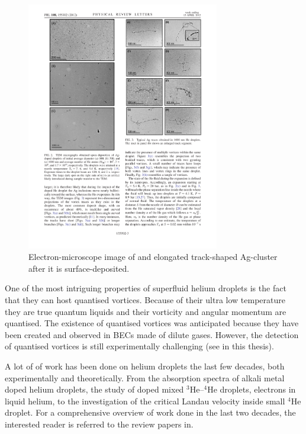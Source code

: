 		\begin{figure}[t]
			\begin{center}
				\includegraphics[width=0.75\textwidth]{silver-filament}
				\caption{Electron-microscope image of and elongated track-shaped Ag-cluster after it is surface-deposited.}
				\label{fig:silver-filament}
			\end{center}
		\end{figure}	
				
		One of the most intriguing properties of superfluid helium droplets is the fact that they can host quantised vortices. Because of their ultra low temperature they are true quantum liquids and their vorticity and angular momentum are quantised. The existence of quantised vortices was anticipated because they have been created and observed in BECs made of dilute gases. However, the detection of quantised vortices is still experimentally challenging (see  in this thesis).
		
		A lot of of work has been done on helium droplets the last few decades, both experimentally and theoretically. From the absorption spectra of alkali metal doped helium droplets, the study of doped mixed $^3$He--$^4$He droplets, electrons in liquid helium, to the investigation of the critical Landau velocity inside small $^4$He droplet. For a comprehensive overview of work done in the last two decades, the interested reader is referred to the review papers in.
\clearpage{\pagestyle{empty}\cleardoublepage}